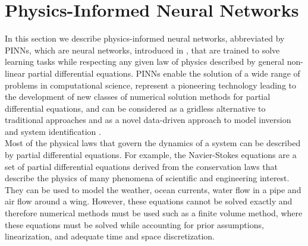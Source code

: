 \section{Physics-Informed Neural Networks}
\label{ch1:sec4}

In this section we describe physics-informed neural networks, abbreviated by PINNs, which are neural networks, introduced in \cite{RaissiPerdikarisKarniadakisPart1:2017}, that are trained to solve learning tasks while respecting any given law of physics described by general non-linear partial differential equations. PINNs enable the solution of a wide range of problems in computational science, represent a pioneering technology leading to the development of new classes of numerical solution methods for partial differential equations, and can be considered as a gridless alternative to traditional approaches and as a novel data-driven approach to model inversion and system identification \cite[p.~3]{RaissiPerdikarisKarniadakis:2019}. \\
Most of the physical laws that govern the dynamics of a system can be described by partial differential equations. For example, the Navier-Stokes equations are a set of partial differential equations derived from the conservation laws that describe the physics of many phenomena of scientific and engineering interest. They can be used to model the weather, ocean currents, water flow in a pipe and air flow around a wing. However, these equations cannot be solved exactly and therefore numerical methods must be used such as a finite volume method, where these equations must be solved while accounting for prior assumptions, linearization, and adequate time and space discretization. \\
